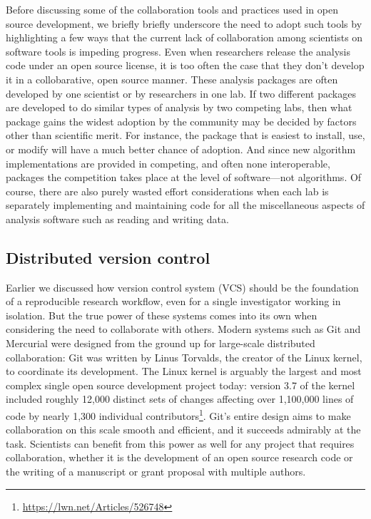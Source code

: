 \documentclass[ChapterTOCs,krantz2]{krantz} %
\theoremstyle{definition}
\begin{document}
Before discussing some of the collaboration tools and practices used in open
source development, we briefly briefly underscore the need to adopt such tools
by highlighting a few ways that the current lack of collaboration among
scientists on software tools is impeding progress. Even when researchers
release the analysis code under an open source license, it is too often the
case that they don't develop it in a collobarative, open source manner.
These analysis packages are often developed by one scientist or by researchers
in one lab. If two different packages are developed to do similar types
of analysis by two competing labs, then what package gains the widest adoption
by the community may be decided by factors other than scientific merit. For
instance, the package that is easiest to install, use, or modify will have
a much better chance of adoption. And since new algorithm implementations
are provided in competing, and often none interoperable, packages the
competition takes place at the level of software---not algorithms. Of course,
there are also purely wasted effort considerations when each lab is separately
implementing and maintaining code for all the miscellaneous aspects of
analysis software such as reading and writing data.


\subsection{Distributed version control}

Earlier we discussed how version control system (VCS) should be the foundation of a
reproducible research workflow, even for a single investigator working in
isolation.  But the true power of these systems comes into its own when
considering the need to collaborate with others.  Modern systems such as Git
and Mercurial were designed from the ground up for large-scale distributed
collaboration: Git was written by Linus Torvalds, the creator of the Linux
kernel, to coordinate its development.  The Linux kernel is arguably the
largest and most complex single open source development project today: version
3.7 of the kernel included roughly 12,000 distinct sets of changes affecting
over 1,100,000 lines of code by nearly 1,300 individual
contributors\footnote{\url{https://lwn.net/Articles/526748}}.  Git's entire
design aims to make collaboration on this scale smooth and efficient, and it
succeeds admirably at the task.  Scientists can benefit from this power as well
for any project that requires collaboration, whether it is the development of
an open source research code or the writing of a manuscript or grant proposal
with multiple authors.
\end{document}

